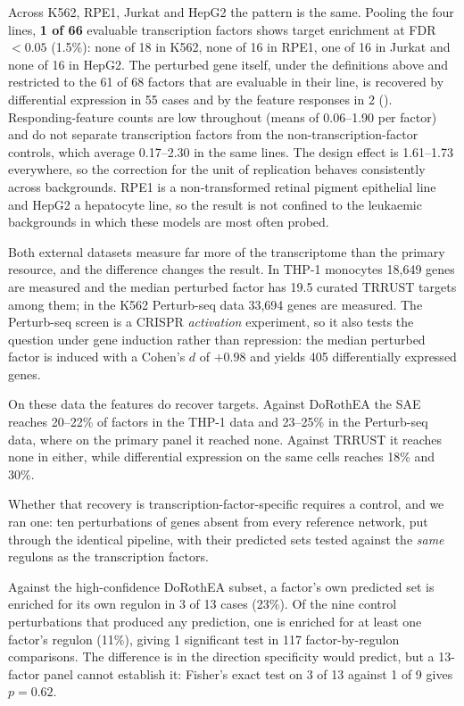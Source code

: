 \documentclass[onecolumn,11pt]{article}
\begin{document}
Across K562, RPE1, Jurkat and HepG2 the pattern is the same. Pooling the four lines,
\textbf{1 of 66} evaluable transcription factors shows target enrichment at FDR $< 0.05$
(1.5\%): none of 18 in K562, none of 16 in RPE1, one of 16 in Jurkat and none of 16 in HepG2. The
perturbed gene itself, under the definitions above and restricted to the 61 of 68 factors that are
evaluable in their line, is recovered by differential expression in 55 cases and by the feature
responses in 2 (). Responding-feature
counts are low throughout (means of 0.06--1.90 per factor) and do not separate transcription
factors from the non-transcription-factor controls, which average 0.17--2.30 in the same lines. The
design effect is 1.61--1.73 everywhere, so the correction for the unit of replication behaves
consistently across backgrounds. RPE1 is a non-transformed retinal pigment epithelial line and
HepG2 a hepatocyte line, so the result is not confined to the leukaemic backgrounds in which these
models are most often probed.

Both external datasets measure far more of the transcriptome than the primary resource, and the
difference changes the result. In THP-1 monocytes 18,649 genes are measured and the median
perturbed factor has 19.5 curated TRRUST targets among them; in the K562 Perturb-seq data 33,694
genes are measured. The Perturb-seq screen is a CRISPR \emph{activation} experiment, so it also
tests the question under gene induction rather than repression: the median perturbed factor is
induced with a Cohen's $d$ of $+0.98$ and yields 405 differentially expressed genes.

On these data the features do recover targets. Against DoRothEA the SAE reaches 20--22\% of factors
in the THP-1 data and 23--25\% in the Perturb-seq data, where on the primary panel it reached none.
Against TRRUST it reaches none in either, while differential expression on the same cells reaches
18\% and 30\%.

Whether that recovery is transcription-factor-specific requires a control, and we ran one: ten
perturbations of genes absent from every reference network, put through the identical pipeline,
with their predicted sets tested against the \emph{same} regulons as the transcription factors.

Against the high-confidence DoRothEA subset, a factor's own predicted set is enriched for its own
regulon in 3 of 13 cases (23\%). Of the nine control perturbations that produced any prediction,
one is enriched for at least one factor's regulon (11\%), giving 1 significant test in 117
factor-by-regulon comparisons. The difference is in the direction specificity would predict, but a
13-factor panel cannot establish it: Fisher's exact test on 3 of 13 against 1 of 9 gives
$p = 0.62$.
\end{document}
